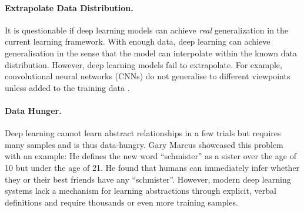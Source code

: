 \paragraph{Extrapolate Data Distribution.} It is questionable if deep learning models can achieve \emph{real} generalization in the current learning framework.
With enough data, deep learning can achieve generalisation in the sense that the model can interpolate within the known data distribution.
However, deep learning models fail to extrapolate.
For example, convolutional neural networks (CNNs) do not generalise to different viewpoints unless added to the training data .

\paragraph{Data Hunger.} Deep learning cannot learn abstract relationships in a few trials but requires many samples and is thus data-hungry.
Gary Marcus  showcased this problem with an example: He defines the new word ``schmister'' as a sister over the age of 10 but under the age of 21. He found that humans can immediately infer whether they or their best friends have any ``schmister''. However, modern deep learning systems lack a mechanism for learning abstractions through explicit, verbal definitions and require thousands or even more training samples.

